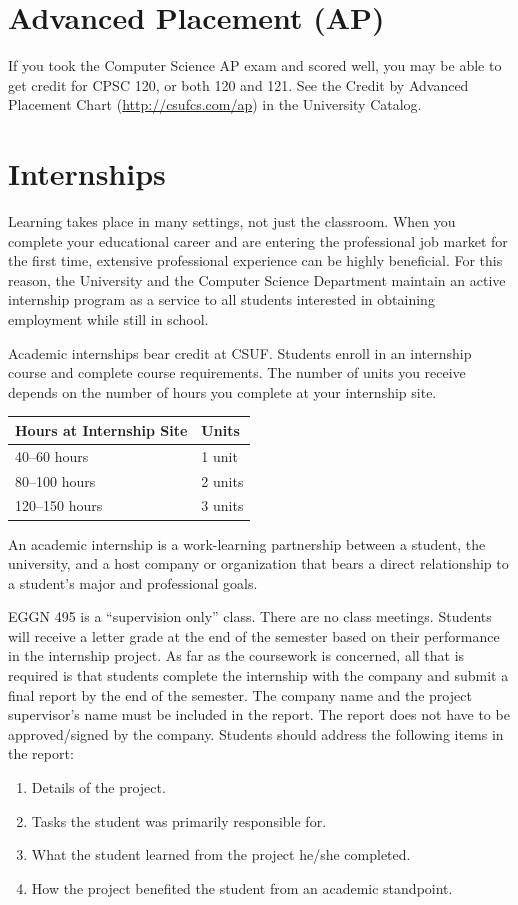 \documentclass{book}
\newcommand{\CampusName}{CSUF}
\newcommand{\shrunkurl}[1]{\url{http://csufcs.com/#1}}
\begin{document}
\section{Advanced Placement (AP)}
\label{section:ap}
If you took the Computer Science AP exam and scored well, you may be able to get credit for CPSC 120, or both 120 and 121. See the Credit by Advanced Placement Chart (\shrunkurl{ap}) in the University Catalog.

\section{Internships}

Learning takes place in many settings, not just the classroom. When you complete your educational career and are entering the professional job market for the first time, extensive professional experience can be highly beneficial. For this reason, the University and the Computer Science Department maintain an active internship program as a service to all students interested in obtaining employment while still in school.

Academic internships bear credit at \CampusName. Students enroll in an internship course and complete course requirements. The number of units you receive depends on the number of hours you complete at your internship site.

\begin{center}
\begin{tabular}{|l|l|} \hline
  \textbf{Hours at Internship Site} & \textbf{Units} \\ \hline
  40--60 hours & 1 unit \\ \hline
  80--100 hours & 2 units \\ \hline
  120--150 hours & 3 units \\ \hline
\end{tabular}
\end{center}

An academic internship is a work-learning partnership between a student, the university, and a host company or organization that bears a direct relationship to a student’s major and professional goals.

EGGN 495 is a ``supervision only'' class. There are no class meetings. Students will receive a letter grade at the end of the semester based on their performance in the internship project. As far as the coursework is concerned, all that is required is that students complete the internship with the company and submit a final report by the end of the semester. The company name and the project supervisor's name must be included in the report. The report does not have to be approved/signed by the company. Students should address the following items in the report:
\begin{enumerate}
\item Details of the project.
\item Tasks the student was primarily responsible for.
\item What the student learned from the project he/she completed.
\item How the project benefited the student from an academic standpoint.
\end{enumerate}
\end{document}
